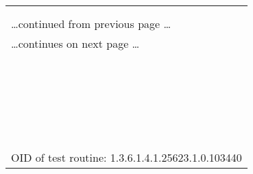 \documentclass{article}
\begin{document}
\begin{longtable}{|p{}|}
\hline
\rowcolor{openvas_warning}{\color{white}{Medium (CVSS: 4.3) }}\\
\rowcolor{openvas_warning}{\color{white}{NVT: Check for SSL Weak Ciphers}}\\
\hline
\endfirsthead
\hfill\ldots continued from previous page \ldots \\
\hline
\endhead
\hline
\ldots continues on next page \ldots \\
\endfoot
\hline
\endlastfoot
\\
\rowcolor{white}{\verb=Weak ciphers offered by this service:=}\\
\rowcolor{white}{\verb=  SSL3_RSA_RC4_40_MD5=}\\
\rowcolor{white}{\verb=  SSL3_RSA_RC4_128_MD5=}\\
\rowcolor{white}{\verb=  SSL3_RSA_RC4_128_SHA=}\\
\rowcolor{white}{\verb=  SSL3_RSA_RC2_40_MD5=}\\
\rowcolor{white}{\verb=  SSL3_RSA_DES_40_CBC_SHA=}\\
\rowcolor{white}{\verb=  SSL3_EDH_RSA_DES_40_CBC_SHA=}\\
\rowcolor{white}{\verb=  SSL3_ADH_RC4_40_MD5=}\\
\rowcolor{white}{\verb=  SSL3_ADH_RC4_128_MD5=}\\
\rowcolor{white}{\verb=  SSL3_ADH_DES_40_CBC_SHA=}\\
\rowcolor{white}{\verb=  TLS1_RSA_RC4_40_MD5=}\\
\rowcolor{white}{\verb=  TLS1_RSA_RC4_128_MD5=}\\
\rowcolor{white}{\verb=  TLS1_RSA_RC4_128_SHA=}\\
\rowcolor{white}{\verb=  TLS1_RSA_RC2_40_MD5=}\\
\rowcolor{white}{\verb=  TLS1_RSA_DES_40_CBC_SHA=}\\
\rowcolor{white}{\verb=  TLS1_EDH_RSA_DES_40_CBC_SHA=}\\
\rowcolor{white}{\verb=  TLS1_ADH_RC4_40_MD5=}\\
\rowcolor{white}{\verb=  TLS1_ADH_RC4_128_MD5=}\\
\rowcolor{white}{\verb=  TLS1_ADH_DES_40_CBC_SHA=}\\
\rowcolor{white}{\verb==}\\
\rowcolor{white}{\verb==}\\
\\
OID of test routine: 1.3.6.1.4.1.25623.1.0.103440\\
\end{longtable}
\end{document}
